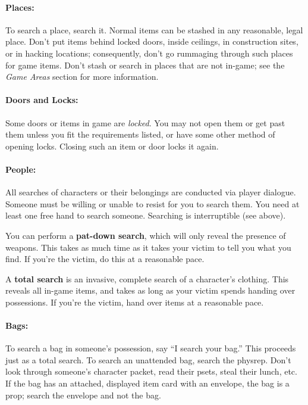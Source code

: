 \documentclass[sheet]{GL2020}
\begin{document}
\paragraph{Places:} To search a place, search it.  Normal items can be stashed in any reasonable, legal place.  Don't put items behind locked doors, inside ceilings, in construction sites, or in hacking locations; consequently, don't go rummaging through such places for game items.  Don't stash or search in places that are not in-game; see the \emph{Game Areas} section for more information.

\paragraph{Doors and Locks:} Some doors or items in game are \emph{locked}. You may not open them or get past them unless you fit the requirements listed, or have some other method of opening locks. Closing such an item or door locks it again.

\paragraph{People:} All searches of characters or their belongings are conducted via player dialogue.  Someone must be willing or unable to resist for you to search them.  You need at least one free hand to search someone.  Searching is interruptible (see above).

You can perform a {\bf pat-down search}, which will only reveal the presence of weapons.  This takes as much time as it takes your victim to tell you what you find.  If you're the victim, do this at a reasonable pace.

A {\bf total search} is an invasive, complete search of a character's clothing.  This reveals all in-game items, and takes as long as your victim spends handing over possessions.  If you're the victim, hand over items at a reasonable pace.

\paragraph{Bags:} To search a bag in someone's possession, say ``I search your bag.''  This proceeds just as a total search.  To search an unattended bag, search the physrep.  Don't look through someone's character packet, read their psets, steal their lunch, etc.  If the bag has an attached, displayed item card with an envelope, the bag is a prop; search the envelope and not the bag.
\end{document}
